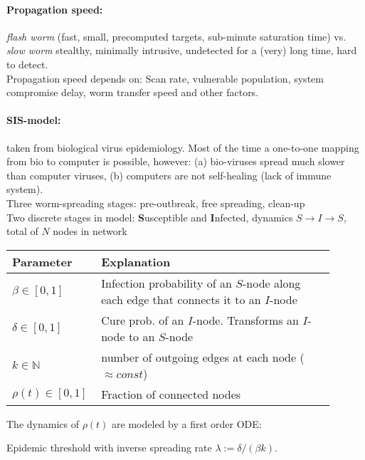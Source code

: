 \paragraph{Propagation speed:} \emph{flash worm} (fast, small, precomputed targets, sub-minute saturation time) vs. \emph{slow worm} stealthy, minimally intrusive, undetected for a (very) long time, hard to detect. \\
Propagation speed depends on:  Scan rate, vulnerable population, system compromise delay, worm transfer speed and other factors.

\paragraph{SIS-model:} taken from biological virus epidemiology. Most of the time a one-to-one mapping from bio to computer is possible, however: (a) bio-viruses spread much slower than computer viruses, (b) computers are not self-healing (lack of immune system). \\
Three worm-spreading stages: pre-outbreak, free spreading, clean-up \\
Two discrete stages in model: \textbf{S}usceptible and \textbf{I}nfected, dynamics $S \to I \to S$, total of $N$ nodes in network

\begin{tabular}{p{0.2\linewidth}p{0.7\linewidth}}
Parameter & Explanation \\
\hline
\hline
$\beta \in \left[0, 1\right]$ & Infection probability of an $S$-node along each edge that connects it to an $I$-node \\
$\delta \in \left[0, 1\right]$ & Cure prob. of an $I$-node. Transforms an $I$-node to an $S$-node \\
$k \in \mathbb{N}$ & number of outgoing edges at each node ($\approx const$)  \\
$\rho(t) \in \left[0, 1\right]$ & Fraction of connected nodes \\
\end{tabular}

The dynamics of $\rho(t)$ are modeled by a first order ODE:

Epidemic threshold
with inverse spreading rate $\lambda := \delta/(\beta k)$. 

